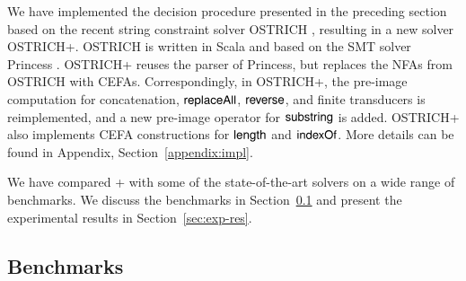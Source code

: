 
We have implemented the decision procedure presented in the preceding section based on the recent string constraint solver OSTRICH \cite{CHL+19}, resulting in a new solver OSTRICH+. OSTRICH is  written in Scala and based on the SMT solver Princess \cite{princess08}. OSTRICH+ reuses the parser of Princess, but replaces the NFAs from OSTRICH with CEFAs. Correspondingly, in OSTRICH+, the pre-image  computation for concatenation, $\mathsf{replaceAll}$, $\mathsf{reverse}$, and finite transducers is reimplemented, and a new pre-image operator for $\mathsf{substring}$ is added. OSTRICH+ also implements CEFA constructions for $\mathsf{length}$ and $\mathsf{indexOf}$.  More details can be found in Appendix, Section~\ref{appendix:impl}.

We have compared {\ostrich}+ with some of the state-of-the-art solvers on a wide range of benchmarks.  
We  discuss the benchmarks in Section~\ref{sec:bench} and %
present the experimental results in Section~\ref{sec:exp-res}.



\subsection{Benchmarks}\label{sec:bench}
 

